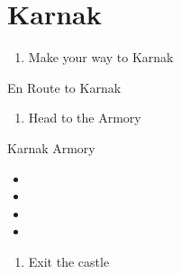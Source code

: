 \chapter{Karnak}

\vspace{\baselineskip}

\begin{paracol}{2}

\begin{enumerate}
    \item Make your way to Karnak
\end{enumerate}

\switchcolumn
\begin{steproute}{En Route to Karnak}
\end{steproute}

\switchcolumn
\resume
\begin{enumerate}[resume]
    \item Head to the Armory
\end{enumerate}

\begin{shop}{Karnak Armory}
    \varwb
    \begin{sell}
        \item {}
        \begin{itemize}
            \item \tent
            \item \knife
            \item \phoenixDown
            \item \potion
        \end{itemize}
    \end{sell}
    \begin{buy}
        \item {} \iceRod \space {}
    \end{buy}
    \varwe
\end{shop}

\switchcolumnTwice
\newpage
\begin{enumerate}[resume]
    \item Exit the castle
\end{enumerate}


\end{paracol}
